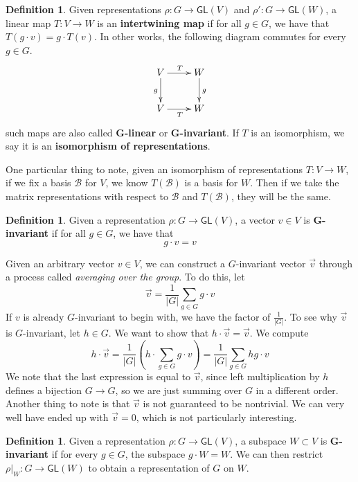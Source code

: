 \documentclass[psamsfonts]{amsart}
\theoremstyle{definition}
\newtheorem{defn}[thm]{Definition}
\theoremstyle{remark}
\newcommand{\GL}{\mathsf{GL}}
\newcommand{\abs}[1]{\left\lvert#1\right\rvert}
\begin{document}
\begin{defn}
Given representations $\rho: G \to \GL(V)$ and $\rho': G\to \GL(W)$, a linear map $T: V \to W$ is an \textbf{intertwining map} if for all $g \in G$, we have that $T(g\cdot v) = g\cdot  T(v)$. In other works, the following diagram commutes for every $g \in G$.
$$\xymatrix{
V \ar[d]_g \ar[r]^T & W \ar[d]^g  \\
V \ar[r]_T & W
}
$$
such maps are also called \textbf{G-linear} or \textbf{G-invariant}. If $T$ is an isomorphism, we say it is an \textbf{isomorphism of representations}.
\end{defn}

One particular thing to note, given  an isomorphism of representations $T: V \to W$, if we fix a basis $\mathscr{B}$ for $V$, we know $T(\mathscr{B})$ is a basis for $W$. Then if we take the matrix representations with respect to $\mathscr{B}$ and $T(\mathscr{B})$, they will be the same.

\begin{defn}
Given a representation $\rho: G \to \GL(V)$, a vector $v \in V$ is \textbf{G-invariant} if for all $g \in G$, we have that
$$g \cdot v = v $$
\end{defn}

Given an arbitrary vector $v \in V$, we can construct a $G$-invariant vector $\vec{v}$ through a process called \emph{averaging over the group}. To do this, let
$$\vec{v} = \frac{1}{\abs{G}}\sum_{g \in G} g \cdot v $$
If $v$ is already $G$-invariant to begin with, we have the factor of $\frac{1}{\abs{G}}$. To see why $\vec{v}$ is $G$-invariant, let $h \in G$. We want to show that $h \cdot\vec{v} = \vec{v}$. We compute
$$h \cdot \vec{v} = \frac{1}{\abs{G}}\left(h \cdot \sum_{g \in G} g \cdot v\right)  = \frac{1}{\abs{G}} \sum_{g \in G}hg \cdot v$$
We note that the last expression is equal to $\vec{v}$, since left multiplication by $h$ defines a bijection $G \to G$, so we are just summing over $G$ in a different order. Another thing to note is that $\vec{v}$ is not guaranteed to be nontrivial. We can very well have ended up with $\vec{v} = 0$, which is not particularly interesting.

\begin{defn}
Given a representation $\rho: G \to \GL(V)$, a subspace $W \subset V$ is \textbf{G-invariant} if for every $g\in G$, the subspace $g \cdot W = W$. We can then restrict $\rho\big\vert_W: G \to \GL(W)$ to obtain a representation of $G$ on $W$. 
\end{defn}
\end{document}
